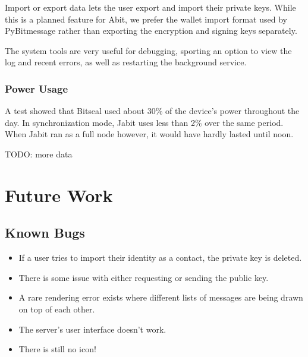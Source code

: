 \documentclass{bfh}
\begin{document}
  Import or export data lets the user export and import their private keys. While this is a planned feature for Abit, we prefer the wallet import format used by PyBitmessage rather than exporting the encryption and signing keys separately.

  The system tools are very useful for debugging, sporting an option to view the log and recent errors, as well as restarting the background service.

  \subsubsection{Power Usage}
  A test showed that Bitseal used about 30\% of the device's power throughout the day. In synchronization mode, Jabit uses less than 2\% over the same period. When Jabit ran as a full node however, it would have hardly lasted until noon.

TODO: more data


  \newpage
  \section{Future Work}
  \subsection{Known Bugs}
  \begin{itemize}
    \item If a user tries to import their identity as a contact, the private key is deleted.
    \item There is some issue with either requesting or sending the public key.
    \item A rare rendering error exists where different lists of messages are being drawn on top of each other.
    \item The server's user interface doesn't work.
    \item There is still no icon!
  \end{itemize}
\end{document}

